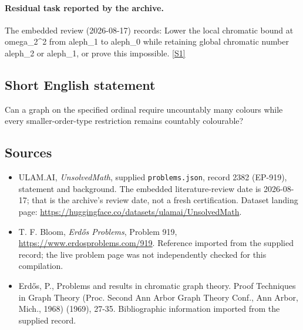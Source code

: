 \documentclass[11pt,a4paper]{article}
\newcommand{\sref}[2]{\hyperlink{source:#1:#2}{[S#2]}}
\begin{document}
\paragraph{Residual task reported by the archive.}

The embedded review (2026-08-17) records: Lower the local chromatic bound at omega\_2\textasciicircum{}2 from aleph\_1 to aleph\_0 while retaining global chromatic number aleph\_2 or aleph\_1, or prove this impossible. \sref{2382}{1}

\subsection{Short English statement}

Can a graph on the specified ordinal require uncountably many colours while every smaller-order-type restriction remains countably colourable?

\subsection{Sources}

{\small

\begin{itemize}

\item[\hypertarget{source:2382:1}{S1}] ULAM.AI, \emph{UnsolvedMath}, supplied \texttt{problems.json}, record 2382 (EP-919), statement and background. The embedded literature-review date is 2026-08-17; that is the archive’s review date, not a fresh certification. Dataset landing page: \url{https://huggingface.co/datasets/ulamai/UnsolvedMath}.

\item[\hypertarget{source:2382:2}{S2}] T. F. Bloom, \emph{Erdős Problems}, Problem 919, \url{https://www.erdosproblems.com/919}. Reference imported from the supplied record; the live problem page was not independently checked for this compilation.

\item[\hypertarget{source:2382:3}{S3}] Erd\H{o}s, P., Problems and results in chromatic graph theory. Proof Techniques in Graph Theory (Proc. Second Ann Arbor Graph Theory Conf., Ann Arbor, Mich., 1968) (1969), 27-35. Bibliographic information imported from the supplied record.

\end{itemize}

}

\label{end:2382}
\end{document}
